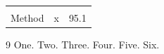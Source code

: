 \documentclass{article}
\begin{document}
\begin{tabular}{lcr}
\cite{b,a} & \cite{c} & \cite{d,e,f} \\
Method \cite{a} & x\cite{b} & 95.1
\end{tabular}

\begin{thebibliography}{9}
 One.
 Two.
 Three.
 Four.
 Five.
 Six.
\end{thebibliography}
\end{document}
